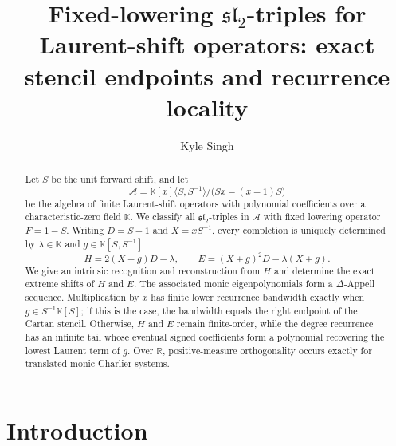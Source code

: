 \documentclass[11pt,reqno]{amsart}
\title[Fixed-lowering $\mathfrak{sl}_2$-triples]{Fixed-lowering $\mathfrak{sl}_2$-triples for Laurent-shift operators: exact stencil endpoints and recurrence locality}
\author{Kyle Singh}
\date{}
\numberwithin{equation}{section}
\theoremstyle{definition}
\theoremstyle{remark}
\newcommand{\K}{\mathbb K}
\newcommand{\R}{\mathbb R}
\newcommand{\algA}{\mathcal A}
\begin{document}
\begin{abstract}
Let \(S\) be the unit forward shift, and let
\[
\algA=\K[x]\langle S,S^{-1}\rangle\big/\bigl(Sx-(x+1)S\bigr)
\]
be the algebra of finite Laurent-shift operators with polynomial coefficients over a characteristic-zero field \(\K\). We classify all \(\mathfrak{sl}_2\)-triples in \(\algA\) with fixed lowering operator \(F=1-S\). Writing \(D=S-1\) and \(X=xS^{-1}\), every completion is uniquely determined by \(\lambda\in\K\) and \(g\in\K[S,S^{-1}]\)
\[
H=2(X+g)D-\lambda,
\qquad
E=(X+g)^2D-\lambda(X+g).
\]
We give an intrinsic recognition and reconstruction from \(H\) and determine the exact extreme shifts of \(H\) and \(E\). The associated monic eigenpolynomials form a \(\Delta\)-Appell sequence. Multiplication by \(x\) has finite lower recurrence bandwidth exactly when \(g\in S^{-1}\K[S]\);  if this is the case, the bandwidth equals the right endpoint of the Cartan stencil. Otherwise, \(H\) and \(E\) remain finite-order, while the degree recurrence has an infinite tail whose eventual signed coefficients form a polynomial recovering the lowest Laurent term of \(g\). Over \(\R\), positive-measure orthogonality occurs exactly for translated monic Charlier systems.


\end{abstract}

\maketitle

\section{Introduction}
\end{document}
